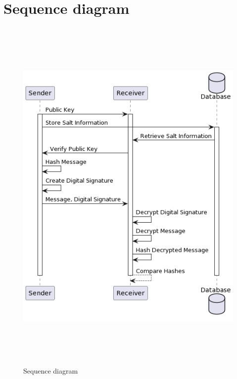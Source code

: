 \section{Sequence diagram}
\begin{figure}[H]
	\centering
	\includegraphics[width=150mm, height=180mm]{images/sequence.png}
	\caption{Sequence diagram} %
	\label{figsequence} %
\end{figure}
\pagebreak
